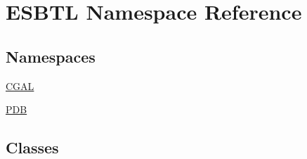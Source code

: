 \hypertarget{namespaceESBTL}{}\section{E\+S\+B\+TL Namespace Reference}
\label{namespaceESBTL}
\subsection*{Namespaces}
\begin{DoxyCompactItemize}
\item 
 \hyperlink{namespaceESBTL_1_1CGAL}{C\+G\+AL}
\item 
 \hyperlink{namespaceESBTL_1_1PDB}{P\+DB}
\end{DoxyCompactItemize}
\subsection*{Classes}
